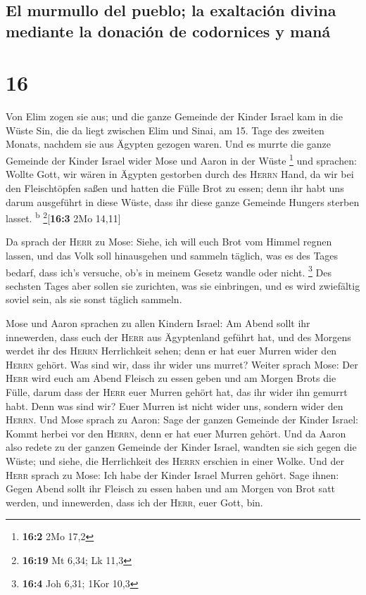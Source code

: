 \hypertarget{el-murmullo-del-pueblo-la-exaltaciuxf3n-divina-mediante-la-donaciuxf3n-de-codornices-y-manuxe1}{%
\subsection{El murmullo del pueblo; la exaltación divina mediante la
donación de codornices y
maná}\label{el-murmullo-del-pueblo-la-exaltaciuxf3n-divina-mediante-la-donaciuxf3n-de-codornices-y-manuxe1}}

\hypertarget{section-15}{%
\section{16}\label{section-15}}

 Von Elim zogen sie aus; und die ganze Gemeinde der Kinder
Israel kam in die Wüste Sin, die da liegt zwischen Elim und Sinai, am
15. Tage des zweiten Monats, nachdem sie aus Ägypten gezogen waren.
 Und es murrte die ganze Gemeinde der Kinder Israel wider
Mose und Aaron in der Wüste \footnote{\textbf{16:2} 2Mo 17,2}
 und sprachen: Wollte Gott, wir wären in Ägypten gestorben
durch des \textsc{Herrn} Hand, da wir bei den Fleischtöpfen saßen und
hatten die Fülle Brot zu essen; denn ihr habt uns darum ausgeführt in
diese Wüste, dass ihr diese ganze Gemeinde Hungers sterben lasset.
\textsuperscript{b} \footnote{\textbf{16:19} Mt 6,34; Lk 11,3}{[}\textbf{16:3}
2Mo 14,11{]}

 Da sprach der \textsc{Herr} zu Mose: Siehe, ich will euch
Brot vom Himmel regnen lassen, und das Volk soll hinausgehen und sammeln
täglich, was es des Tages bedarf, dass ich's versuche, ob's in meinem
Gesetz wandle oder nicht. \footnote{\textbf{16:4} Joh 6,31; 1Kor 10,3}
 Des sechsten Tages aber sollen sie zurichten, was sie
einbringen, und es wird zwiefältig soviel sein, als sie sonst täglich
sammeln.

 Mose und Aaron sprachen zu allen Kindern Israel: Am Abend
sollt ihr innewerden, dass euch der \textsc{Herr} aus Ägyptenland
geführt hat,  und des Morgens werdet ihr des
\textsc{Herrn} Herrlichkeit sehen; denn er hat euer Murren wider den
\textsc{Herrn} gehört. Was sind wir, dass ihr wider uns murret?
 Weiter sprach Mose: Der \textsc{Herr} wird euch am Abend
Fleisch zu essen geben und am Morgen Brots die Fülle, darum dass der
\textsc{Herr} euer Murren gehört hat, das ihr wider ihn gemurrt habt.
Denn was sind wir? Euer Murren ist nicht wider uns, sondern wider den
\textsc{Herrn}.  Und Mose sprach zu Aaron: Sage der ganzen
Gemeinde der Kinder Israel: Kommt herbei vor den \textsc{Herrn}, denn er
hat euer Murren gehört.  Und da Aaron also redete zu der
ganzen Gemeinde der Kinder Israel, wandten sie sich gegen die Wüste; und
siehe, die Herrlichkeit des \textsc{Herrn} erschien in einer Wolke.
 Und der \textsc{Herr} sprach zu Mose: 
Ich habe der Kinder Israel Murren gehört. Sage ihnen: Gegen Abend sollt
ihr Fleisch zu essen haben und am Morgen von Brot satt werden, und
innewerden, dass ich der \textsc{Herr}, euer Gott, bin.

